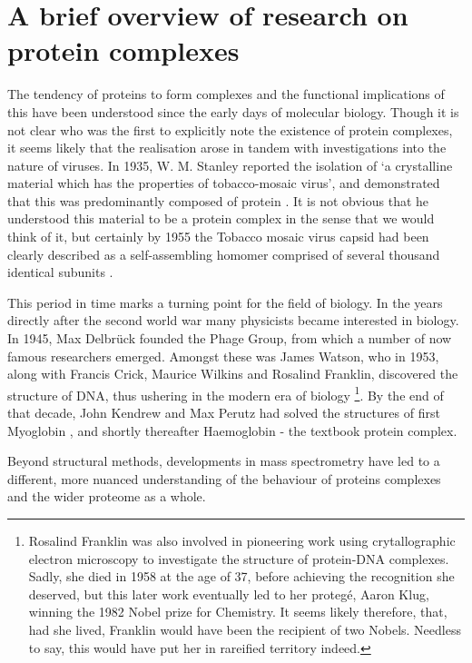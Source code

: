 \documentclass[a4paper,11pt,twoside,openright]{scrbook}
\begin{document}
\section{A brief overview of research on protein complexes}
The tendency of proteins to form complexes and the functional implications of this have been understood since the early days of molecular biology. Though it is not clear who was the first to explicitly note the existence of protein complexes, it seems likely that the realisation arose in tandem with investigations into the nature of viruses. In 1935, W. M. Stanley reported the isolation of `a crystalline material which has the properties of tobacco-mosaic virus', and demonstrated that this was predominantly composed of protein \cite{Stanley1935}. It is not obvious that he understood this material to be a protein complex in the sense that we would think of it, but certainly by 1955 the Tobacco mosaic virus capsid had been clearly described as a self-assembling homomer comprised of several thousand identical subunits \cite{Fraenkel-Conrat1955}.

This period in time marks a turning point for the field of biology. In the years directly after the second world war many physicists became interested in biology. In 1945, Max Delbr{\"u}ck founded the Phage Group, from which a number of now famous researchers emerged. Amongst these was James Watson, who in 1953, along with Francis Crick, Maurice Wilkins and Rosalind Franklin, discovered the structure of DNA, thus ushering in the modern era of biology \footnote{ Rosalind Franklin was also involved in pioneering work using crytallographic electron microscopy to investigate the structure of protein-DNA complexes. Sadly, she died in 1958 at the age of 37, before achieving the recognition she deserved, but this later work eventually led to her proteg{\'e},  Aaron Klug, winning the 1982 Nobel prize for Chemistry. It seems likely therefore, that, had she lived, Franklin would have been the recipient of two Nobels. Needless to say, this would have put her in rareified territory indeed.}.
By the end of that decade, John Kendrew and Max Perutz had solved the structures of first Myoglobin \cite{Kendrew1958}, and shortly thereafter Haemoglobin \cite{Perutz1960} - the textbook protein complex.


Beyond structural methods, developments in mass spectrometry have led to a different, more nuanced understanding of the behaviour of proteins complexes and the wider proteome as a whole.
\end{document}
